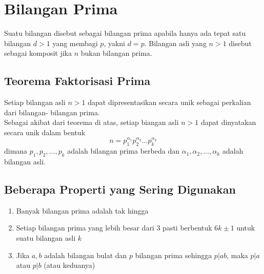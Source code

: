 \documentclass[11pt]{scrartcl}
\begin{document}

\section{Bilangan Prima}
Suatu bilangan disebut sebagai bilangan prima apabila hanya ada tepat satu bilangan $d>1$ yang membagi $p$, yakni $d = p$. Bilangan asli yang $n>1$ disebut sebagai komposit jika $n$ bukan bilangan prima.
\subsection{Teorema Faktorisasi Prima}
Setiap bilangan asli $n > 1$ dapat dipresentasikan secara unik sebagai perkalian dari bilangan- bilangan prima.\\
Sebagai akibat dari teorema di atas, setiap biangan asli $n > 1$ dapat dinyatakan secara unik dalam bentuk $$n = p_1^{\alpha_1}p_2^{\alpha_2}...p_k^{\alpha_k}$$ dimana $p_1,p_2,...,p_k$ adalah bilangan prima berbeda dan $\alpha_1,\alpha_2,...,\alpha_k$ adalah bilangan asli.
\subsection{Beberapa Properti yang Sering Digunakan}
\begin{enumerate}
\item Banyak bilangan prima adalah tak hingga
\item Setiap bilangan prima yang lebih besar dari $3$ pasti berbentuk $6k \pm 1$ untuk suatu bilangan asli $k$
\item Jika $a,b$ adalah bilangan bulat dan $p$ bilangan prima sehingga $p|ab$, maka $p|a$ atau $p|b$ (atau keduanya)
\end{enumerate}
\end{document}
